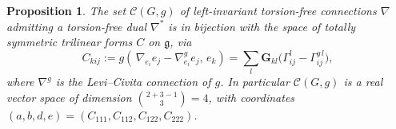 \documentclass{amsart}
\newtheorem{proposition}{Proposition}
\theoremstyle{definition}
\theoremstyle{remark}
\begin{document}
\begin{proposition}\label{prop:dim}
The set $\mathcal{C}(G,g)$ of left-invariant torsion-free connections $\nabla$ admitting a torsion-free dual
$\nabla^{*}$ is in bijection with the space of totally symmetric trilinear forms
$C$ on $\mathfrak g$, via
\begin{equation}\label{eq:cubic}
C_{kij}:=g\!\left(\,\nabla_{e_i}e_j-\nabla^{g}_{e_i}e_j,\,e_k\right)
=\sum_{l}\mathbf{G}_{kl}\bigl(\Gamma^{l}_{ij}-\Gamma^{g\,l}_{ij}\bigr),
\end{equation}
where $\nabla^{g}$ is the Levi--Civita connection of $g$. In particular $\mathcal{C}(G,g)$ is a real vector space
of dimension $\binom{2+3-1}{3}=4$, with coordinates
$(a,b,d,e)=(C_{111},C_{112},C_{122},C_{222})$.
\end{proposition}
\end{document}
